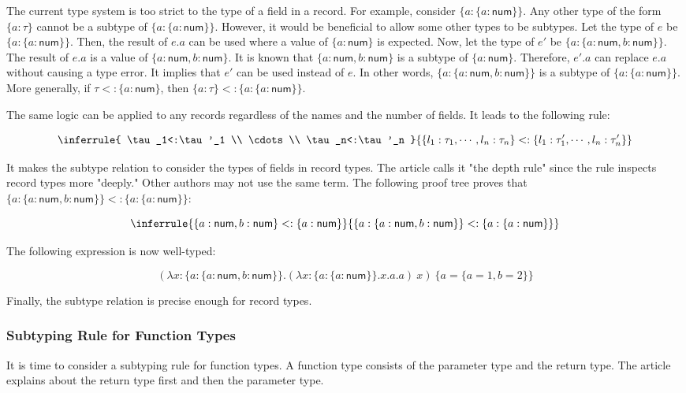The current type system is too strict to the type of a field in a record. For
example, consider $\{a:\{a:\textsf{num}\}\}$. Any other type of the form
$\{a:\tau\}$ cannot be a subtype of $\{a:\{a:\textsf{num}\}\}$. However, it
would be beneficial to allow some other types to be subtypes. Let the type of
$e$ be $\{a:\{a:\textsf{num}\}\}$. Then, the result of $e.a$ can be used
where a value of $\{a:\textsf{num}\}$ is expected. Now, let the type of $e'$ be
$\{a:\{a:\textsf{num},b:\textsf{num}\}\}$. The result of $e.a$ is a value of
$\{a:\textsf{num},b:\textsf{num}\}$. It is known that \(\{a:\textsf{num},b:\textsf{
num}\}\) is a subtype of $\{a:\textsf{num}\}$. Therefore, $e'.a$ can replace
$e.a$ without causing a type error. It implies that $e'$ can be used instead
of $e$. In other words, $\{a:\{a:\textsf{num},b:\textsf{num}\}\}$ is a subtype of
$\{a:\{a:\textsf{num}\}\}$. More generally, if $\tau<:\{a:\textsf{num}\}$, then
$\{a:\tau\}<:\{a:\{a:\textsf{num}\}\}$.

The same logic can be applied to any records regardless of the names and the
number of fields. It leads to the following rule:

\[
\inferrule
{ \tau_1<:\tau'_1 \\ \cdots \\ \tau_n<:\tau'_n }
{ \{l_1:\tau_1,\cdots,l_n:\tau_n\}<:\{l_1:\tau'_1,\cdots,l_n:\tau'_n\} }
\]

It makes the subtype relation to consider the types of fields in record types.
The article calls it "the depth rule" since the rule inspects record types more
"deeply." Other authors may not use the same term. The following proof tree
proves that $\{a:\{a:\textsf{num},b:\textsf{num}\}\}<:\{a:\{a:\textsf{num}\}\}$:

\[
\inferrule
{ \{a:\textsf{num},b:\textsf{num}\}<:\{a:\textsf{num}\} }
{ \{a:\{a:\textsf{num},b:\textsf{num}\}\}<:\{a:\{a:\textsf{num}\}\} }
\]

The following expression is now well-typed:

\[
(\lambda x:\{a:\{a:\textsf{num},b:\textsf{num}\}\}.(\lambda
x:\{a:\{a:\textsf{num}\}\}.x.a.a)\ x)\ \{a=\{a=1,b=2\}\}
\]

Finally, the subtype relation is precise enough for record types.

\subsubsection{Subtyping Rule for Function Types}

It is time to consider a subtyping rule for function types. A function type
consists of the parameter type and the return type. The article explains about
the return type first and then the parameter type.

